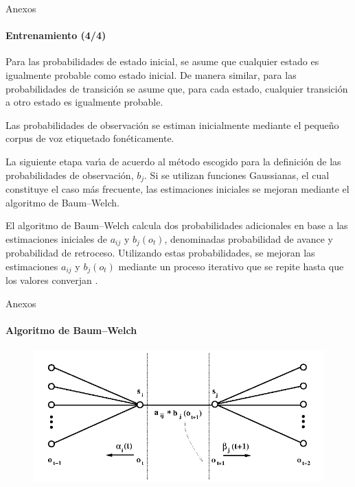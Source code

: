 \begin{frame}[noframenumbering]{Anexos}
\framesubtitle{Entrenamiento (4/4)}

Para las probabilidades de estado inicial, se asume que cualquier estado es igualmente probable 
como estado inicial. De manera similar, para las probabilidades de transici\'on se asume que, para cada estado, cualquier transici\'on a otro estado es igualmente probable.

Las probabilidades de observaci\'on se estiman inicialmente mediante el peque\~no corpus 
de voz etiquetado fon\'eticamente.

La siguiente etapa var{\'\i}a de acuerdo al m\'etodo escogido para la definici\'on de las probabilidades
de observaci\'on, $b_j$. Si se utilizan funciones Gaussianas, el cual constituye el caso m\'as
frecuente, las estimaciones iniciales se mejoran mediante el algoritmo de Baum--Welch.

El algoritmo de Baum--Welch calcula dos probabilidades adicionales en base a las estimaciones
iniciales de $a_{ij}$ y $b_j(o_t)$, denominadas probabilidad de avance y probabilidad de retroceso. 
Utilizando estas probabilidades, se mejoran las estimaciones $a_{ij}$ y $b_j(o_t)$ mediante
un proceso iterativo que se repite hasta que los valores converjan \cite{Rabiner89atutorial}.
\end{frame}

\begin{frame}[noframenumbering]{Anexos}
\framesubtitle{Algoritmo de Baum--Welch}
\begin{figure}[H]
\centering
\includegraphics[width=1\linewidth]{./graphics/forward-backward.png}
\end{figure}
\end{frame}

